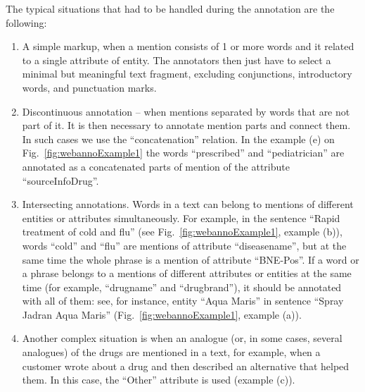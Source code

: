 \documentclass[a4paper,fleqn,longmktitle]{cas-dc}
\begin{document}
The typical situations that had to be handled during the annotation are the following:
\begin{enumerate}
    \item A simple markup, when a mention consists of 1 or more words and it related to a single attribute of entity. The annotators then just have to select a minimal but meaningful text fragment, excluding conjunctions, introductory words, and punctuation marks.
    \item Discontinuous annotation -- when mentions separated by words that are not part of it. It is then necessary to annotate mention parts and connect them. In such cases we use the ``concatenation'' relation. In the example (e) on Fig.~\ref{fig:webannoExample1} the words ``prescribed'' and ``pediatrician'' are annotated as a concatenated parts of mention of the attribute ``sourceInfoDrug''.
    \item Intersecting annotations. Words in a text can belong to mentions of different entities or attributes simultaneously. For example, in the sentence ``Rapid treatment of cold and flu'' (see Fig.~\ref{fig:webannoExample1}, example (b)), words ``cold'' and ``flu'' are mentions of attribute ``diseasename'', but at the same time the whole phrase is a mention of attribute ``BNE-Pos''. If a word or a phrase belongs to a mentions of different attributes or entities at the same time (for example, ``drugname'' and ``drugbrand''), it should be annotated with all of them: see, for instance, entity ``Aqua Maris'' in sentence ``Spray Jadran Aqua Maris'' (Fig.~\ref{fig:webannoExample1}, example (a)).
    \item Another complex situation is when an analogue (or, in some cases, several analogues) of the drugs are mentioned in a text, for example, when a customer wrote about a drug and then described an alternative that helped them. In this case, the ``Other'' attribute is used (example (c)).
\end{enumerate}

\end{document}
